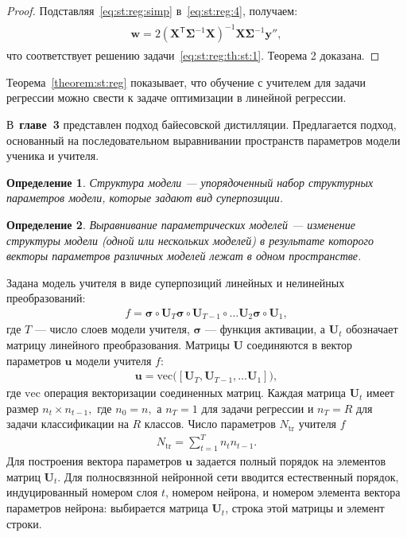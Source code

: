 \documentclass{dissert}
\newtheorem{definition}{Определение}
\begin{document}
\begin{proof}
Подставляя~\eqref{eq:st:reg:simp} в~\eqref{eq:st:reg:4}, получаем:
\begin{gather}
\label{eq:st:reg:5}
\begin{aligned}
\mathbf{w} = 2\left(\mathbf{X}^{\mathsf{T}}\bm{\Sigma}^{-1}\mathbf{X}\right)^{-1}\mathbf{X}\bm{\Sigma}^{-1}\mathbf{y''},
\end{aligned}
\end{gather}
что соответствует решению задачи~\eqref{eq:st:reg:th:st:1}. Теорема 2 доказана.
\end{proof}

Теорема~\ref{theorem:st:reg} показывает, что обучение с учителем для задачи регрессии можно свести к задаче оптимизации в линейной регрессии.

В~\textbf{главе~3} представлен подход байесовской дистилляции. Предлагается подход, основанный на последовательном выравнивании пространств параметров модели ученика и учителя. 
\begin{definition}
\label{def:structure}
Структура модели --- упорядоченный набор структурных параметров модели, которые задают вид суперпозиции.
\end{definition}
\begin{definition}
\label{def:sopos}
Выравнивание параметрических моделей --- изменение структуры модели (одной или нескольких моделей) в результате которого векторы параметров различных моделей лежат в одном пространстве.
\end{definition}

Задана модель учителя в виде суперпозиций линейных и нелинейных преобразований:
\[
\label{ch:3:eq:st:2}
\begin{aligned}
f = \bm{\sigma} \circ \mathbf{U}_T \bm{\sigma} \circ \mathbf{U}_{T-1}\circ \ldots  \mathbf{U}_2\bm{\sigma} \circ \mathbf{U}_1,
\end{aligned}
\]
где $T$ --- число слоев модели учителя, $\bm{\sigma}$ --- функция активации, а $\mathbf{U}_t$ обозначает матрицу линейного преобразования. Матрицы $\mathbf{U}$ соединяются в вектор параметров $\mathbf{u}$ модели учителя $f$:
\[
\label{ch:3:eq:st:2.1}
\begin{aligned}
\mathbf{u} = \text{vec}\bigr(\left[\mathbf{U}_T, \mathbf{U}_{T-1}, \ldots \mathbf{U}_1\right]\bigr),
\end{aligned}
\]
где $\text{vec}$ операция векторизации соединенных матриц.
Каждая матрица $\mathbf{U}_t$ имеет размер $n_t\times n_{t-1},$ где $n_0=n,$ а  $n_T={1}$ для задачи регрессии и $n_T=R$ для задачи классификации на $R$ классов. Число параметров $N_{\text{tr}}$ учителя $f$
\[
\label{ch:3:eq:st:2.2}
\begin{aligned}
N_{\text{tr}} = \sum_{t=1}^{T}n_tn_{t-1}.
\end{aligned}
\]
Для построения вектора параметров $\mathbf{u}$ задается полный порядок на элементов матриц $\mathbf{U}_t$. Для полносвязнной нейронной сети вводится естественный порядок, индуцированный номером слоя $t$, номером нейрона, и номером элемента вектора параметров нейрона: выбирается матрица $\mathbf{U}_t$, строка этой матрицы и элемент строки.
\end{document}
